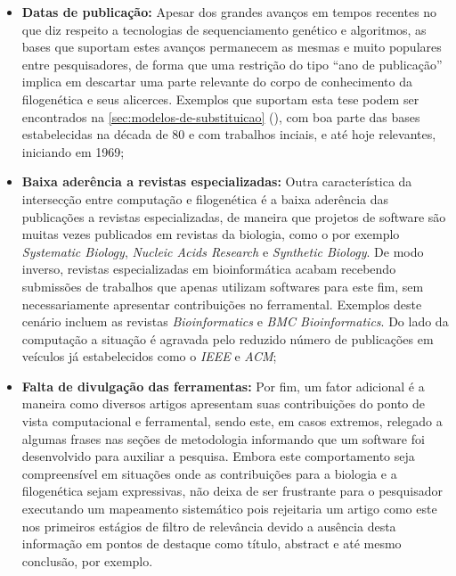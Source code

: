 \documentclass[english,brazilian]{UNISINOSmonografia} %
\begin{document}
\begin{itemize}
	
	\item \textbf{Datas de publicação:}
	Apesar dos grandes avanços em tempos recentes no que diz respeito a tecnologias de sequenciamento genético e algoritmos, as bases que suportam estes avanços permanecem as mesmas e muito populares entre pesquisadores, de forma que uma restrição do tipo ``ano de publicação'' implica em descartar uma parte relevante do corpo de conhecimento da filogenética e seus alicerces.
	Exemplos que suportam esta tese podem ser encontrados na \autoref{sec:modelos-de-substituicao} (), com boa parte das bases estabelecidas na década de 80 e com trabalhos inciais, e até hoje relevantes, iniciando em 1969;
	
	\item \textbf{Baixa aderência a revistas especializadas:}
	Outra característica da intersecção entre computação e filogenética é a baixa aderência das publicações a revistas especializadas, de maneira que projetos de software são muitas vezes publicados em revistas da biologia, como o por exemplo \textit{Systematic Biology}, \textit{Nucleic Acids Research} e \textit{Synthetic Biology}. 
	De modo inverso, revistas especializadas em bioinformática acabam recebendo submissões de trabalhos que apenas utilizam softwares para este fim, sem necessariamente apresentar contribuições no ferramental. Exemplos deste cenário incluem as revistas \textit{Bioinformatics} e \textit{BMC Bioinformatics}.
	Do lado da computação a situação é agravada pelo reduzido número de publicações em veículos já estabelecidos como o \textit{IEEE} e \textit{ACM};
	
	\item \textbf{Falta de divulgação das ferramentas:}
	Por fim, um fator adicional é a maneira como diversos artigos apresentam suas contribuições do ponto de vista computacional e ferramental, sendo este, em casos extremos, relegado a algumas frases nas seções de metodologia informando que um software foi desenvolvido para auxiliar a pesquisa. Embora este comportamento seja compreensível em situações onde as contribuições para a biologia e a filogenética sejam expressivas, não deixa de ser frustrante para o pesquisador executando um mapeamento sistemático pois rejeitaria um artigo como este nos primeiros estágios de filtro de relevância devido a ausência desta informação em pontos de destaque como título, abstract e até mesmo conclusão, por exemplo.

\end{itemize}
\end{document}

